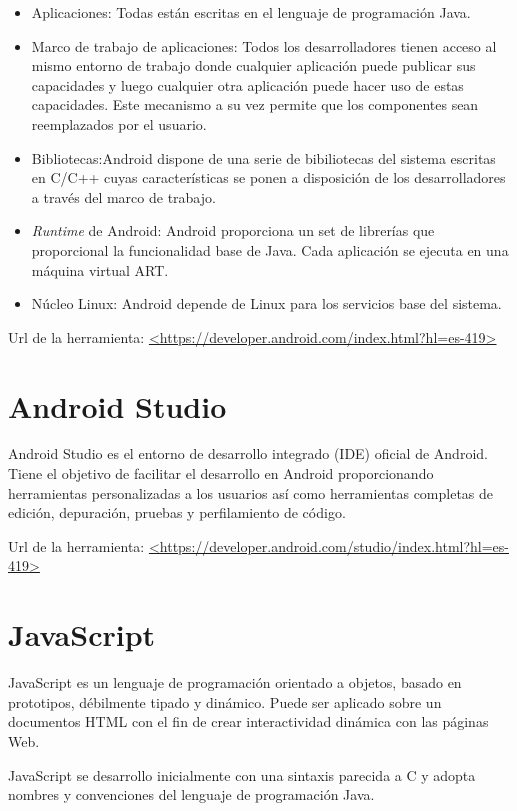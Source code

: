 \begin{itemize}
	\item{Aplicaciones}: Todas están escritas en el lenguaje de programación Java.
	\item{Marco de trabajo de aplicaciones}: Todos los desarrolladores tienen acceso al mismo entorno de trabajo donde cualquier aplicación puede publicar sus capacidades y luego cualquier otra aplicación puede hacer uso de estas capacidades. Este mecanismo a su vez permite que los componentes sean reemplazados por el usuario.
	\item{Bibliotecas}:Android dispone de una serie de bibiliotecas del sistema escritas en C/C++ cuyas características se ponen a disposición de los desarrolladores a través del marco de trabajo.
	\item{\textit{Runtime} de Android}: Android proporciona un set de librerías que proporcional la funcionalidad base de Java. Cada aplicación se ejecuta en una máquina virtual ART.
	\item{Núcleo Linux}: Android depende de Linux para los servicios base del sistema.
\end{itemize}


Url de la herramienta: \url{<https://developer.android.com/index.html?hl=es-419>}

\section{Android Studio}

Android Studio es el entorno de desarrollo integrado (IDE) oficial de Android. Tiene el objetivo de facilitar el desarrollo en Android proporcionando herramientas personalizadas a los usuarios así como herramientas completas de edición, depuración, pruebas y perfilamiento de código.

Url de la herramienta: \url{<https://developer.android.com/studio/index.html?hl=es-419>}

\section{JavaScript}

JavaScript es un lenguaje de programación orientado a objetos, basado en prototipos, débilmente tipado y dinámico. Puede ser aplicado sobre un documentos HTML con el fin de crear interactividad dinámica con las páginas Web.

JavaScript se desarrollo inicialmente con una sintaxis parecida a C y adopta nombres y convenciones del lenguaje de programación Java.\cite{wiki:javascript}

